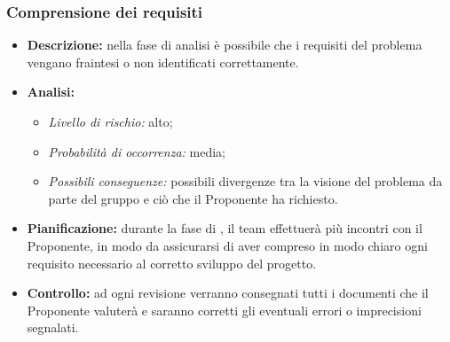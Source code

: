 		\subsubsection{Comprensione dei requisiti}
			\begin{itemize}
				\item \textbf{Descrizione:} nella fase di analisi è possibile che i requisiti del problema vengano fraintesi o non identificati correttamente. 
				\item \textbf{Analisi:}
				\begin{itemize}
					\item \textit{Livello di rischio:} alto;
					\item \textit{Probabilità di occorrenza:} media;
					\item \textit{Possibili conseguenze:} possibili divergenze tra la visione del problema da parte del gruppo e ciò che il Proponente ha richiesto.
				\end{itemize}
				\item \textbf{Pianificazione:} durante la fase di , il team effettuerà più incontri con il Proponente, in modo da assicurarsi di aver compreso in modo chiaro ogni requisito necessario al corretto sviluppo del progetto.
				\item \textbf{Controllo:} ad ogni revisione verranno consegnati tutti i documenti che il Proponente valuterà e saranno corretti gli eventuali errori o imprecisioni segnalati.
			\end{itemize}